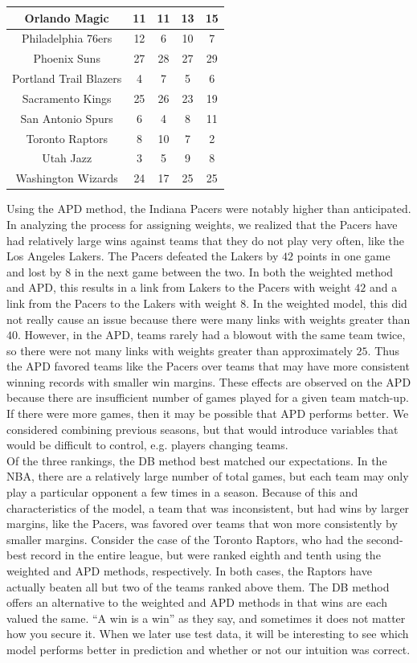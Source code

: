 \documentclass[12pt]{article}%
\begin{document}
\begin{center}
\begin{tabular}{|c|c |c |c| c|}
Orlando Magic & 11&11 &13 &15\\\hline
Philadelphia 76ers &12 &6 &10&7 \\\hline
Phoenix Suns & 27& 28& 27&29\\\hline
Portland Trail Blazers  &4 &7 &5&6 \\\hline
Sacramento Kings & 25&26 &23&19 \\\hline
San Antonio Spurs & 6& 4&8& 11\\\hline
Toronto Raptors & 8& 10&7&2 \\\hline
Utah Jazz &3 & 5& 9 &8\\\hline
Washington Wizards & 24& 17& 25 &25 \\\hline
\end{tabular}
\end{center}
\null\quad\quad Using the APD method, the Indiana Pacers were notably higher than anticipated. In analyzing the process for assigning weights, we realized that the Pacers have had relatively large wins against teams that they do not play very often, like the Los Angeles Lakers. The Pacers defeated the Lakers by $42$ points in one game and lost by $8$ in the next game between the two. In both the weighted method and APD, this results in a link from Lakers to the Pacers with weight $42$ and a link from the Pacers to the Lakers with weight $8$. In the weighted model, this did not really cause an issue because there were many links with weights greater than $40$. However, in the APD, teams rarely had a blowout with the same team twice, so there were not many links with weights greater than approximately $25$. Thus the APD favored teams like the Pacers over teams that may have more consistent winning records with smaller win margins. These effects are observed on the APD because there are insufficient number of games played for a given team match-up. If there were more games, then it may be possible that APD performs better. We considered combining previous seasons, but that would introduce variables that would be difficult to control, e.g. players changing teams.\\
\null\quad\quad Of the three rankings, the DB method best matched our expectations. In the NBA, there are a relatively large number of total games, but each team may only play a particular opponent a few times in a season. Because of this and characteristics of the model, a team that was inconsistent, but had wins by larger margins, like the Pacers, was favored over teams that won more consistently by smaller margins. Consider the case of the Toronto Raptors, who had the second-best record in the entire league, but were ranked eighth and tenth using the weighted and APD methods, respectively. In both cases, the Raptors have actually beaten all but two of the teams ranked above them. The DB method offers an alternative to the weighted and APD methods in that wins are each valued the same. ``A win is a win'' as they say, and sometimes it does not matter how you secure it. When we later use test data, it will be interesting to see which model performs better in prediction and whether or not our intuition was correct.\\
\end{document}
